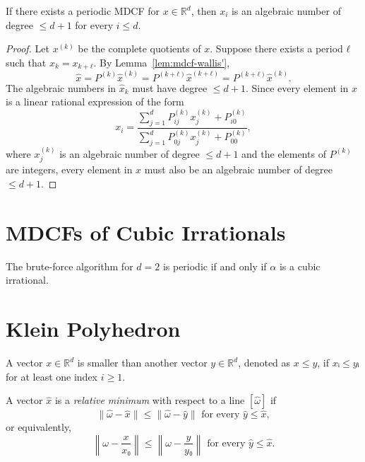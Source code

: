 \begin{theorem}
  If there exists a periodic MDCF for $x ∈ ℝ^d$,
  then $x_i$ is an algebraic number of degree $≤ d+1$ for every $i ≤ d$.
\end{theorem}

\begin{proof}
  Let $x^{(k)}$ be the complete quotients of $x$.
  Suppose there exists a period $ℓ$ such that $x_k = x_{k+ℓ}$.
  By Lemma~\ref{lem:mdcf-wallis'},
  \[
    \hat x = P^{(k)} \hat x^{(k)} = P^{(k+ℓ)} \hat x^{(k+ℓ)} = P^{(k+ℓ)} \hat x^{(k)}.
  \]
  The algebraic numbers in $\hat x_k$ must have degree $≤ d+1$.
  Since every element in $x$ is a linear rational expression of the form
  \[
    x_i = \frac{∑_{j=1}^d P_{ij}^{(k)} x_j^{(k)} + P_{i0}^{(k)}}{\sum_{j=1}^d P_{0j}^{(k)} x_j^{(k)} + P_{00}^{(k)}},
  \]
  where $x_j^{(k)}$ is an algebraic number of degree $≤ d+1$ and the elements of $P^{(k)}$ are integers,
  every element in $x$ must also be an algebraic number of degree $≤ d+1$.
\end{proof}

\section{MDCFs of Cubic Irrationals}

\begin{conjecture}
  The brute-force algorithm for $d = 2$ is periodic if and only if $α$ is a cubic irrational.
\end{conjecture}

\section{Klein Polyhedron}

A vector $x ∈ ℝ^d$ is smaller than another vector $y ∈ ℝ^d$, denoted as $x ≤ y$, if $xᵢ ≤ yᵢ$ for at least one index $i ≥ 1$.

\begin{definition}
  A vector $\hat x$ is a \emph{relative minimum} with respect to a line $[\hat ω]$ if
  \[
    \|\hat ω - \hat x\| ≤ \|\hat ω - \hat y\| \text{ for every } \hat y ≤ \hat x,
  \]
  or equivalently,
  \[
    \left\|ω - \frac{x}{x₀} \right\| ≤ \left\|ω - \frac{y}{y₀}\right\| \text{ for every } \hat y ≤ \hat x.
  \]
\end{definition}

